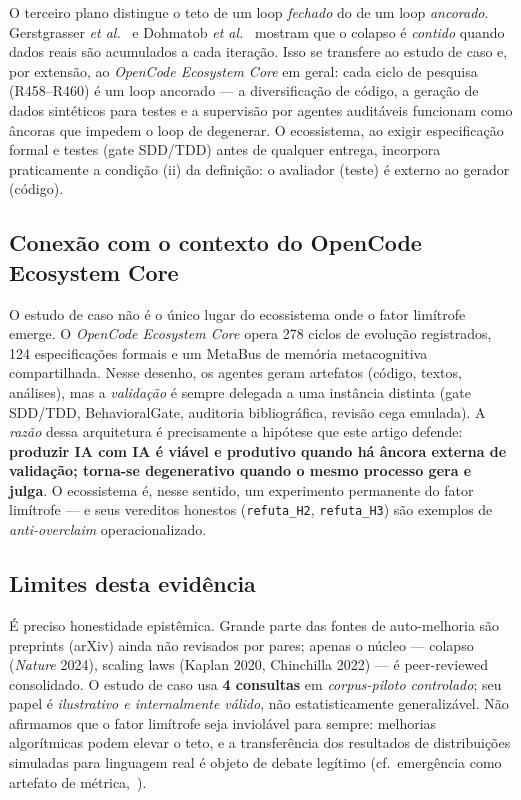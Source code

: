 O terceiro plano distingue o teto de um loop \emph{fechado} do de um loop
\emph{ancorado}. Gerstgrasser \textit{et al.}~\parencite{Gerstgrasser2024Collapse}
e Dohmatob \textit{et al.}~\parencite{Dohmatob2024CollapseScaling} mostram que o
colapso é \emph{contido} quando dados reais são acumulados a cada iteração. Isso
se transfere ao estudo de caso e, por extensão, ao \emph{OpenCode Ecosystem Core}
em geral: cada ciclo de pesquisa (R458--R460) é um loop ancorado --- a
diversificação de código, a geração de dados sintéticos para testes e a
supervisão por agentes auditáveis funcionam como âncoras que impedem o loop de
degenerar. O ecossistema, ao exigir especificação formal e testes (gate SDD/TDD)
antes de qualquer entrega, incorpora praticamente a condição (ii) da definição:
o avaliador (teste) é externo ao gerador (código).

\subsection{Conexão com o contexto do OpenCode Ecosystem Core}

O estudo de caso não é o único lugar do ecossistema onde o fator limítrofe emerge.
O \emph{OpenCode Ecosystem Core} opera 278 ciclos de evolução registrados, 124
especificações formais e um MetaBus de memória metacognitiva compartilhada. Nesse
desenho, os agentes geram artefatos (código, textos, análises), mas a \emph{validação
} é sempre delegada a uma instância distinta (gate SDD/TDD, BehavioralGate,
auditoria bibliográfica, revisão cega emulada). A \emph{razão} dessa arquitetura é
precisamente a hipótese que este artigo defende: \textbf{produzir IA com IA é
viável e produtivo quando há âncora externa de validação; torna-se degenerativo
quando o mesmo processo gera e julga}. O ecossistema é, nesse sentido, um
experimento permanente do fator limítrofe --- e seus vereditos honestos
(\texttt{refuta\_H2}, \texttt{refuta\_H3}) são exemplos de \emph{anti-overclaim}
operacionalizado.

\subsection{Limites desta evidência}

É preciso honestidade epistêmica. Grande parte das fontes de auto-melhoria são
preprints (arXiv) ainda não revisados por pares; apenas o núcleo --- colapso
(\emph{Nature} 2024), scaling laws (Kaplan 2020, Chinchilla 2022) --- é
peer-reviewed consolidado. O estudo de caso usa \textbf{4 consultas} em
\emph{corpus-piloto controlado}; seu papel é \emph{ilustrativo e internalmente
válido}, não estatisticamente generalizável. Não afirmamos que o fator limítrofe
seja inviolável para sempre: melhorias algorítmicas podem elevar o teto, e a
transferência dos resultados de distribuições simuladas para linguagem real é
objeto de debate legítimo (cf.~emergência como artefato de métrica,~\textcite
{Schaeffer2023EmergentMirage}).
